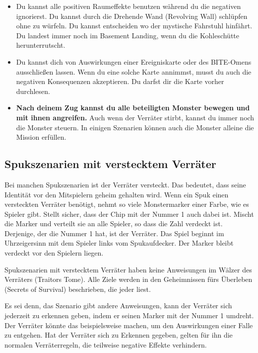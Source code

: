   \begin{itemize}
    \item Du kannst alle positiven Raumeffekte benutzen während du die negativen ignorierst. Du kannst durch die Drehende Wand (Revolving Wall) schlüpfen ohne zu würfeln. Du kannst entscheiden wo der mystische Fahrstuhl hinfährt. Du landest immer noch im Basement Landing, wenn du die Kohleschütte herunterrutscht.
    \item Du kannst dich von Auswirkungen einer Ereigniskarte oder des BITE-Omens ausschließen lassen. Wenn du eine solche Karte annimmst, musst du auch die negativen Konsequenzen akzeptieren. Du darfst dir die Karte vorher durchlesen.
    \item \textbf{Nach deinem Zug kannst du alle beteiligten Monster bewegen und mit ihnen angreifen.} Auch wenn der Verräter stirbt, kannst du immer noch die Monster steuern. In einigen Szenarien können auch die Monster alleine die Mission erfüllen.
  \end{itemize}

\subsection{Spukszenarien mit verstecktem Verräter}
\label{kap:rule:hiddentraitor}

Bei manchen Spukszenarien ist der Verräter versteckt. Das bedeutet, dass seine Identität vor den Mitspielern geheim gehalten wird. Wenn ein Spuk einen versteckten Verräter benötigt, nehmt so viele Monstermarker einer Farbe, wie es Spieler gibt. Stellt sicher, dass der Chip mit der Nummer 1 auch dabei ist. Mischt die Marker und verteilt sie an alle Spieler, so dass die Zahl verdeckt ist. Derjenige, der die Nummer 1 hat, ist der Verräter. Das Spiel beginnt im Uhrzeigersinn mit dem Spieler links vom Spukaufdecker. Der Marker bleibt verdeckt vor den Spielern liegen.

Spukszenarien mit verstecktem Verräter haben keine Anweisungen im Wälzer des Verräters (Traitors Tome). Alle Ziele werden in den Geheimnissen fürs Überleben (Secrets of Survival) beschrieben, die jeder liest.

Es sei denn, das Szenario gibt andere Anweisungen, kann der Verräter sich jederzeit zu erkennen geben, indem er seinen Marker mit der Nummer 1 umdreht. Der Verräter könnte das beispielsweise machen, um den Auswirkungen einer Falle zu entgehen. Hat der Verräter sich zu Erkennen gegeben, gelten für ihn die normalen Verräterregeln, die teilweise negative Effekte verhindern.

